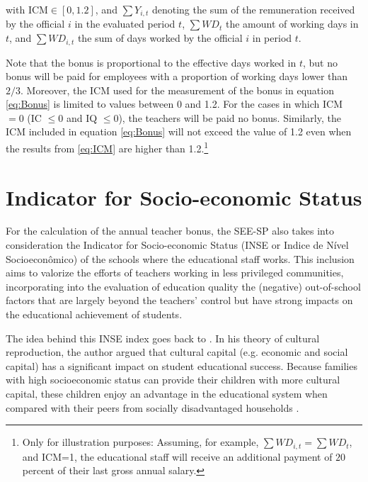 \documentclass[a4paper, 12pt]{article}
\begin{document}
with $\text{ICM} \in [0,1.2]$, and $\sum Y_{i,t}$ denoting the sum of the remuneration received by the official $i$ in the evaluated period $t$, $\sum WD_{t}$ the amount of working days in $t$, and $\sum WD_{i,t}$ the sum of days worked by the official $i$ in period $t$.

Note that the bonus is proportional to the effective days worked in $t$, but no bonus will be paid for employees with a proportion of working days lower than $2/3$. Moreover, the ICM used for the measurement of the bonus in equation \eqref{eq:Bonus} is limited to values between 0 and 1.2. For the cases in which ICM $=0$ (IC $\leq 0$ and IQ $\leq 0$), the teachers will be paid no bonus. Similarly, the ICM included in equation \eqref{eq:Bonus} will not exceed the value of 1.2 even when the results from \eqref{eq:ICM} are higher than 1.2.\footnote{Only for illustration purposes: Assuming, for example, $\sum WD_{i,t}=\sum WD_{t}$, and ICM=1, the educational staff will receive an additional payment of $20$ percent of their last gross annual salary.} 







\section{Indicator for Socio-economic Status} \label{INSE}

For the calculation of the annual teacher bonus, the SEE-SP also takes into consideration the Indicator for Socio-economic Status (INSE or Indice de Nível Socioeconômico) of the schools where the educational staff works. This inclusion aims to valorize the efforts of teachers working in less privileged communities, incorporating into the evaluation of education quality the (negative) out-of-school factors that are largely beyond the teachers’ control but have strong impacts on the educational achievement of students.

The idea behind this INSE index goes back to \citet{bourdieu1986forms}. In his theory of cultural reproduction, the author argued that cultural capital (e.g. economic and social capital) has a significant impact on student educational success. Because families with high socioeconomic status can provide their children with more cultural capital, these children enjoy an advantage in the educational system when compared with their peers from socially disadvantaged households \citep{jaeger2017cultural}.
\end{document}
